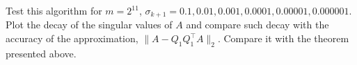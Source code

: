 \documentclass[11pt]{article}
\begin{document}
Test this algorithm for $m = 2^{11}$, $\sigma_{k+1} = 0.1, 0.01, 0.001, 0.0001, 0.00001, 0.000001$. Plot the decay of the singular values of $A$ and compare such decay with the accuracy of the approximation,  $ \| A - Q_1Q_1^{\top}A\|_2$. Compare it with the theorem presented above.



\end{document}
